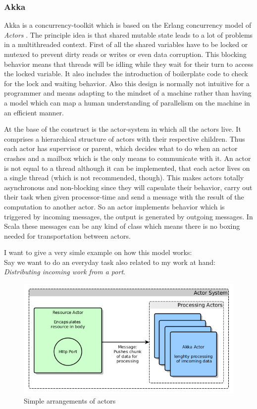 \documentclass[11p]{scrartcl}
\begin{document}
\subsubsection{Akka}
\label{sec:akka}
Akka \citep{link:akkaHome} is a concurrency-toolkit which is based on the Erlang concurrency model of \textit{Actors} \cite{link:erlangConcurrency}.
The principle idea is that shared mutable state leads to a lot of problems in a multithreaded context. First of all the shared variables have to be locked or mutexed to prevent dirty reads or writes or even data corruption. This blocking behavior means that threads will be idling while they wait for their turn to access the locked variable. It also includes the introduction of boilerplate code to check for the lock and waiting behavior. Also this design is normally not intuitive for a programmer and means adapting to the mindset of a machine rather than having a model which can map a human understanding of parallelism on the machine in an efficient manner.

At the base of the construct is the actor-system in which all the actors live. It comprises a hierarchical structure of actors with their respective children. Thus each actor has supervisor or parent, which decides what to do when an actor crashes and a mailbox which is the only means to communicate with it. An actor is not equal to a thread although it can be implemented, that each actor lives on a single thread (which is not recommended, though).
This makes actors totally asynchronous and non-blocking since they will capsulate their behavior, carry out their task when given processor-time and send a message with the result of the computation to another actor. So an actor implements behavior which is triggered by incoming messages, the output is generated by outgoing messages. In Scala these messages can be any kind of class which means there is no boxing needed for transportation between actors.

I want to give a very simle example on how this model works:\\
Say we want to do an everyday task also related to my work at hand: \textit{Distributing incoming work from a port}.

\begin{figure}[h]		
 	\includegraphics[scale=0.4]{figures/akkaExample1.png}
	\caption{Simple arrangements of actors}
	\label{fig:akkaExample1}
\end{figure}
\end{document}
